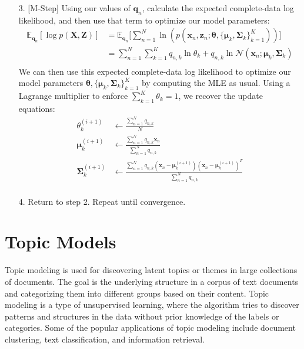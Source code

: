 \documentclass[12pt,letterpaper]{article}
\begin{document}
\begin{itemize}
    \item[3.] [M-Step] Using our values of $\textbf{q}_n$, calculate the expected complete-data log likelihood, and then use that term to optimize our model parameters:
        \begin{align*}
            \mathbb{E}_{\textbf{q}_n}[\log p(\textbf{X}, \textbf{Z})] &= \mathbb{E}_{\textbf{q}_n} \bigg[ \sum_{n=1}^{N} \ln(p(\textbf{x}_n, \textbf{z}_n; \boldsymbol{\theta}, \{ \boldsymbol{\mu}_k, \boldsymbol{\Sigma}_k \}_{k=1}^{K})) \bigg] \\
            &= \sum_{n=1}^{N} \sum_{k=1}^{K} q_{n, k} \ln \theta_k + q_{n, k} \ln \mathcal{N}(\textbf{x}_n; \boldsymbol{\mu}_k, \boldsymbol{\Sigma}_k) \\
        \end{align*}
        We can then use this expected complete-data log likelihood to optimize our model parameters $\boldsymbol{\theta}, \{ \boldsymbol{\mu}_k, \boldsymbol{\Sigma}_k \}_{k=1}^{K}$ by computing the MLE as usual. Using a Lagrange multiplier to enforce $\sum_{k=1}^{K} \theta_k = 1$, we recover the update equations:
        \begin{align*}
            \theta_k^{(i + 1)} &\leftarrow \frac{\sum_{n=1}^{N} q_{n, k}}{N} \\
            \boldsymbol{\mu}_k^{(i + 1)} &\leftarrow \frac{\sum_{n=1}^{N} q_{n, k} \textbf{x}_n}{\sum_{n=1}^{N} q_{n, k}} \\
            \boldsymbol{\Sigma}_k^{(i + 1)} &\leftarrow \frac{\sum_{n=1}^{N} q_{n, k} (\textbf{x}_n - \boldsymbol{\mu}_k^{(i + 1)})(\textbf{x}_n - \boldsymbol{\mu}_k^{(i + 1)})^{T}}{\sum_{n=1}^{N} q_{n, k}} \\
        \end{align*}
    \item[4.] Return to step 2. Repeat until convergence.
\end{itemize}

\section{Topic Models}

Topic modeling is used for discovering latent topics or themes in large collections of documents. The goal is the underlying structure in a corpus of text documents and categorizing them into different groups based on their content. Topic modeling is a type of unsupervised learning, where the algorithm tries to discover patterns and structures in the data without prior knowledge of the labels or categories. Some of the popular applications of topic modeling include document clustering, text classification, and information retrieval. 
\end{document}
